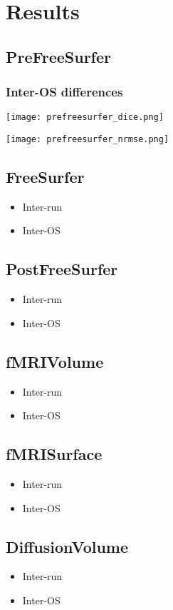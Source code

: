 \chapter{Results}

\section{PreFreeSurfer}

\subsection{Inter-OS differences}
\begin{center}
  \texttt{[image: prefreesurfer\_dice.png]}
   \label{fig:Prefreesurfer Dice}
\end{center}

\begin{center}
  \texttt{[image: prefreesurfer\_nrmse.png]}
   \label{fig:Prefreesurfer NRMSE}
\end{center}

\section{FreeSurfer}
\begin{itemize}
    \item Inter-run
    \item Inter-OS
  \end{itemize}
  
\section{PostFreeSurfer}
\begin{itemize}
    \item Inter-run
    \item Inter-OS
  \end{itemize}
  
\section{fMRIVolume}
\begin{itemize}
    \item Inter-run
    \item Inter-OS
  \end{itemize}
  
\section{fMRISurface}
\begin{itemize}
    \item Inter-run
    \item Inter-OS
  \end{itemize}
  
\section{DiffusionVolume}
\begin{itemize}
    \item Inter-run
    \item Inter-OS
  \end{itemize}

